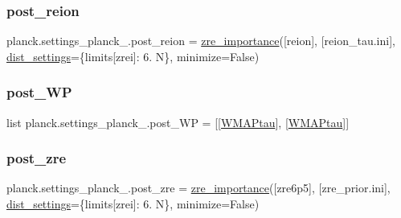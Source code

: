 \subsubsection{\texorpdfstring{post\+\_\+reion}{post\_reion}}
{\footnotesize\ttfamily planck.\+settings\+\_\+planck\+\_.\+post\+\_\+reion = \mbox{\hyperlink{classplanck_1_1settings__planck__2015_1_1zre__importance}{zre\+\_\+importance}}(\mbox{[}\textquotesingle{}reion\textquotesingle{}\mbox{]}, \mbox{[}\textquotesingle{}reion\+\_\+tau.\+ini\textquotesingle{}\mbox{]}, \mbox{\hyperlink{namespaceplanck_1_1settings__planck__2015_a168acdeb73e627d1f1dcf9e11ba082b1}{dist\+\_\+settings}}=\{\textquotesingle{}limits\mbox{[}zrei\mbox{]}\textquotesingle{}\+: \textquotesingle{}6. N\textquotesingle{}\}, minimize=False)}

\mbox{\label{namespaceplanck_1_1settings__planck__2015_a1d93e510e1ebb72d67a23206f13ce8af}} 
\subsubsection{\texorpdfstring{post\+\_\+\+WP}{post\_WP}}
{\footnotesize\ttfamily list planck.\+settings\+\_\+planck\+\_.\+post\+\_\+\+WP = \mbox{[}\mbox{[}\textquotesingle{}\mbox{\hyperlink{namespaceplanck_1_1settings__planck__2015_a3ca8321192e0fb0b03f58da7ac40121f}{W\+M\+A\+Ptau}}\textquotesingle{}\mbox{]}, \mbox{[}\mbox{\hyperlink{namespaceplanck_1_1settings__planck__2015_a3ca8321192e0fb0b03f58da7ac40121f}{W\+M\+A\+Ptau}}\mbox{]}\mbox{]}}

\mbox{\label{namespaceplanck_1_1settings__planck__2015_a4449b886fe6c3a1a7db67bca3f2c5819}} 
\subsubsection{\texorpdfstring{post\+\_\+zre}{post\_zre}}
{\footnotesize\ttfamily planck.\+settings\+\_\+planck\+\_.\+post\+\_\+zre = \mbox{\hyperlink{classplanck_1_1settings__planck__2015_1_1zre__importance}{zre\+\_\+importance}}(\mbox{[}\textquotesingle{}zre6p5\textquotesingle{}\mbox{]}, \mbox{[}\textquotesingle{}zre\+\_\+prior.\+ini\textquotesingle{}\mbox{]}, \mbox{\hyperlink{namespaceplanck_1_1settings__planck__2015_a168acdeb73e627d1f1dcf9e11ba082b1}{dist\+\_\+settings}}=\{\textquotesingle{}limits\mbox{[}zrei\mbox{]}\textquotesingle{}\+: \textquotesingle{}6. N\textquotesingle{}\}, minimize=False)}

